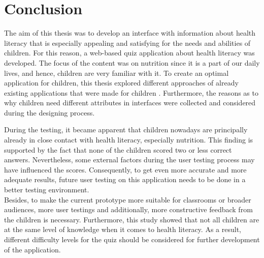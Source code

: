 \section{Conclusion}
\label{section:Conclusion}
The aim of this thesis was to develop an interface with information about health literacy that is especially appealing and satisfying for the needs and abilities of children. 
For this reason, a web-based quiz application about health literacy was developed. The focus of the content was on nutrition since it is a part of our daily lives, and hence, children are very familiar with it. To create an optimal application for children, this thesis explored different approaches of already existing applications that were made for children \autocite{gossen2012search, alhussayen2015evaluating, adattil2018effects}. Furthermore, the reasons as to why children need different attributes in interfaces were collected and considered during the designing process.

During the testing, it became apparent that children nowadays are principally already in close contact with health literacy, especially nutrition. This finding is supported by the fact that none of the children scored two or less correct answers. Nevertheless, some external factors during the user testing process may have influenced the scores. Consequently, to get even more accurate and more adequate results, future user testing on this application needs to be done in a better testing environment.\\
Besides, to make the current prototype more suitable for classrooms or broader audiences, more user testings and additionally, more constructive feedback from the children is necessary. Furthermore, this study showed that not all children are at the same level of knowledge when it comes to health literacy. As a result, different difficulty levels for the quiz should be considered for further development of the application.